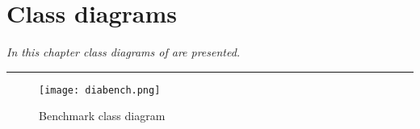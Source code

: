 \chapter{\posl{} Class diagrams}
\label{app:sgp}
\textit{In this chapter class diagrams of \posl{} are presented.}
\vfill
\newpage


\noindent\rule[2pt]{\textwidth}{0.8pt}

\clearpage


\begin{figure}
	\centering
	\texttt{[image: diabench.png]}
	\caption[]{Benchmark class diagram}\label{diag:bench}
\end{figure}